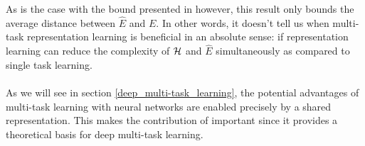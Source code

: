 As is the case with the bound presented in \citet{baxter1995} however, this result only bounds the average distance between $\hat{E}$ and $E$. In other words, it doesn't tell us when multi-task representation learning is beneficial in an absolute sense: if representation learning can reduce the complexity of $\mathcal{H}$ and $\hat{E}$ simultaneously as compared to single task learning.
\\\\
As we will see in section \ref{deep_multi-task_learning}, the potential advantages of multi-task learning with neural networks are enabled precisely by a shared representation. This makes the contribution of \citet{baxter1995} important since it provides a theoretical basis for deep multi-task learning.
\\\\
